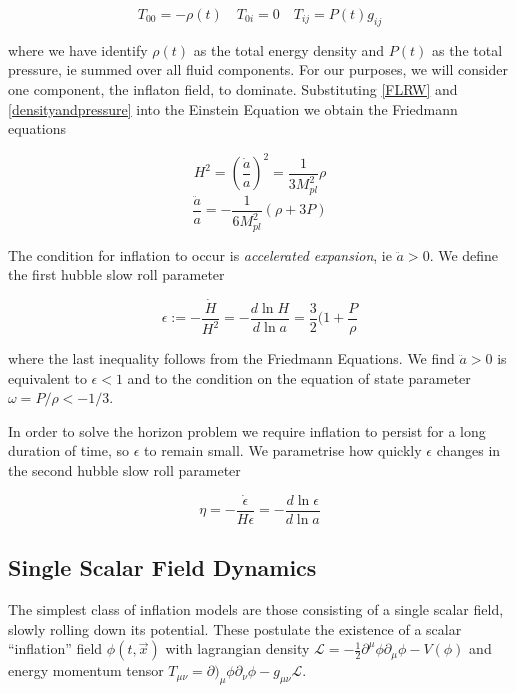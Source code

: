 \documentclass[a4paper,11pt]{article}
\newcommand{\Mp}{M_{pl}}
\newcommand{\half}{\frac{1}{2}}
\begin{document}
\begin{equation}
\label{densityandpressure}
T_{00} = - \rho(t) \quad T_{0i} = 0 \quad T_{ij} = P(t)g_{ij}
\end{equation}

where we have identify $\rho(t)$ as the total energy density and $P(t)$ as the total pressure, ie summed over all fluid components. For our purposes, we will consider one component, the inflaton field, to dominate.  Substituting \ref{FLRW} and \ref{densityandpressure} into the Einstein Equation we obtain the Friedmann equations

\begin{equation}
H^2 = (\frac{\dot{a}}{a})^2 = \frac{1}{3\Mp^2}\rho
\tag{F1}
\label{F1}
\end{equation}
\begin{equation}
\frac{\ddot{a}}{a} = -\frac{1}{6\Mp^2}(\rho + 3P)
\tag{F2}
\label{F2}
\end{equation}

The condition for inflation to occur is \textit{accelerated expansion}, ie $\ddot{a} >0$. We define the first hubble slow roll parameter 

\begin{equation}
\label{epsilon}
\epsilon := -\frac{\dot{H}}{H^2} = -\frac{d\ln{H}}{d\ln{a}} = \frac{3}{2}(1+\frac{P}{\rho}
\end{equation}

where the last inequality follows from the Friedmann Equations. We find $\ddot{a} >0$ is equivalent to $\epsilon<1$ and to the condition on the equation of state parameter $\omega=P/\rho < -1/3$. 

In order to solve the horizon problem we require inflation to persist for a long duration of time, so $\epsilon$ to remain small. We parametrise how quickly $\epsilon$ changes in the second hubble slow roll parameter 

\begin{equation}
\eta = -\frac{\dot{\epsilon}}{H\epsilon} = -\frac{d\ln{\epsilon}}{d\ln{a}}
\end{equation}

\subsection{Single Scalar Field Dynamics}

The simplest class of inflation models are those consisting of a single scalar field, slowly rolling down its potential. These postulate the existence of a scalar ``inflation'' field $\phi(t,\vec{x})$ with lagrangian density $\mathcal{L} = -\half \partial^\mu \phi \partial_\mu \phi - V(\phi)$ and energy momentum tensor $T_{\mu\nu}= \partial)_\mu \phi \partial_\nu \phi - g_{\mu\nu}\mathcal{L}$. \\
\end{document}
